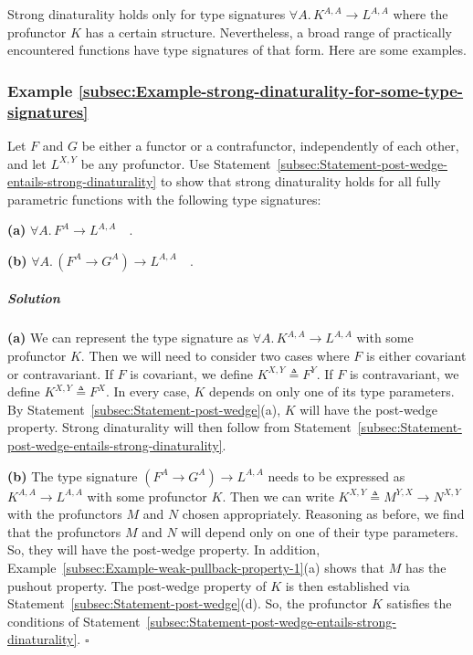 Strong dinaturality holds only for type signatures $\forall A.\,K^{A,A}\rightarrow L^{A,A}$
where the profunctor $K$ has a certain structure. Nevertheless, a
broad range of practically encountered functions have type signatures
of that form. Here are some examples.

\subsubsection{Example \label{subsec:Example-strong-dinaturality-for-some-type-signatures}\ref{subsec:Example-strong-dinaturality-for-some-type-signatures}}

Let $F$ and $G$ be either a functor or a contrafunctor, independently
of each other, and let $L^{X,Y}$ be any profunctor. Use Statement~\ref{subsec:Statement-post-wedge-entails-strong-dinaturality}
to show that strong dinaturality holds for all fully parametric functions
with the following type signatures:

\textbf{(a)} $\forall A.\,F^{A}\rightarrow L^{A,A}\quad.$

\textbf{(b)} $\forall A.\,(F^{A}\rightarrow G^{A})\rightarrow L^{A,A}\quad.$

\subparagraph{Solution}

\textbf{(a)} We can represent the type signature as $\forall A.\,K^{A,A}\rightarrow L^{A,A}$
with some profunctor $K$. Then we will need to consider two cases
where $F$ is either covariant or contravariant. If $F$ is covariant,
we define $K^{X,Y}\triangleq F^{Y}$. If $F$ is contravariant, we
define $K^{X,Y}\triangleq F^{X}$. In every case, $K$ depends on
only one of its type parameters. By Statement~\ref{subsec:Statement-post-wedge}(a),
$K$ will have the post-wedge property. Strong dinaturality will then
follow from Statement~\ref{subsec:Statement-post-wedge-entails-strong-dinaturality}.

\textbf{(b)} The type signature $(F^{A}\rightarrow G^{A})\rightarrow L^{A,A}$
needs to be expressed as $K^{A,A}\rightarrow L^{A,A}$ with some profunctor
$K$. Then we can write $K^{X,Y}\triangleq M^{Y,X}\rightarrow N^{X,Y}$
with the profunctors $M$ and $N$ chosen appropriately. Reasoning
as before, we find that the profunctors $M$ and $N$ will depend
only on one of their type parameters. So, they will have the post-wedge
property. In addition, Example~\ref{subsec:Example-weak-pullback-property-1}(a)
shows that $M$ has the pushout property. The post-wedge property
of $K$ is then established via Statement~\ref{subsec:Statement-post-wedge}(d).
So, the profunctor $K$ satisfies the conditions of Statement~\ref{subsec:Statement-post-wedge-entails-strong-dinaturality}.
$\square$

